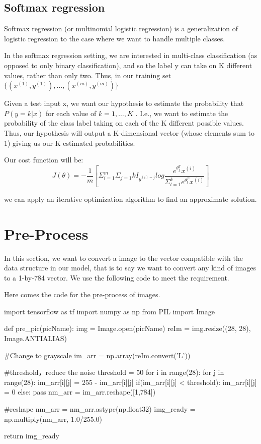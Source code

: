 \documentclass[12pt,hyperref,]{ctexart}
\begin{document}
\subsection{Softmax regression}\label{softmax-regression}

Softmax regression (or multinomial logistic regression) is a
generalization of logistic regression to the case where we want to
handle multiple classes.

In the softmax regression setting, we are interested in multi-class
classification (as opposed to only binary classification), and so the
label y can take on K different values, rather than only two. Thus, in
our training set \(\{(x^{(1)},y^{(1)}),…,(x^{(m)},y^{(m)})\}\)

Given a test input x, we want our hypothesis to estimate the probability
that \(P(y=k|x)\) for each value of \(k=1,…,K\) . I.e., we want to
estimate the probability of the class label taking on each of the K
different possible values. Thus, our hypothesis will output a
K-dimensional vector (whose elements sum to 1) giving us our K estimated
probabilities.

Our cost function will be:\\
\[J(\theta) = -\frac{1}{m}[\Sigma_{i=1}^m\Sigma_{j=1}{k}I_{y^{(i)=j}}
                            log\frac{e^{\theta^T_j}x^{(i)}}{\Sigma_{l=1}^k e^{\theta^T_l}x^{(i)}}]\]

we can apply an iterative optimization algorithm to find an approximate
solution.

\newpage

\section{Pre-Process}\label{pre-process}

In this section, we want to convert a image to the vector compatible
with the data structure in our model, that is to say we want to convert
any kind of images to a 1-by-784 vector. We use the following code to
meet the requirement.

Here comes the code for the pre-process of images.

\begin{python}
import tensorflow as tf
import numpy as np
from PIL import Image

def pre_pic(picName):
    img = Image.open(picName)
    reIm = img.resize((28, 28), Image.ANTIALIAS)
    
    #Change to grayscale
    im_arr = np.array(reIm.convert('L'))
    
    #threshold，reduce the noise
    threshold = 50
    for i in range(28):
        for j in range(28):
            im_arr[i][j] = 255 - im_arr[i][j]
            if(im_arr[i][j] < threshold):
                im_arr[i][j] = 0
            else: pass
    nm_arr = im_arr.reshape([1,784])
    
    #reshape
    nm_arr = nm_arr.astype(np.float32)
    img_ready = np.multiply(nm_arr, 1.0/255.0)

    return img_ready
\end{python}
\end{document}
